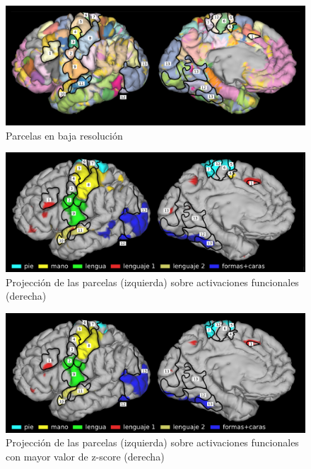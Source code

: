 \begin{figure}[h!]
    \includegraphics[width=\textwidth]{img/32k_labels.png}
    \caption{Parcelas en baja resoluci\'on}
    \label{fig:32k}
\end{figure}


\begin{figure}[h!]
    \includegraphics[width=\textwidth]{img/32k_z5.png}
    \caption{Projecci\'on de las parcelas (izquierda) sobre activaciones funcionales (derecha)}
    \label{fig:32k}
\end{figure}

\begin{figure}[h!]
    \includegraphics[width=\textwidth]{img/32k_z7.png}
    \caption{Projecci\'on de las parcelas (izquierda) sobre activaciones funcionales con 
             mayor valor de z-score (derecha)}
    \label{fig:32k}
\end{figure}
